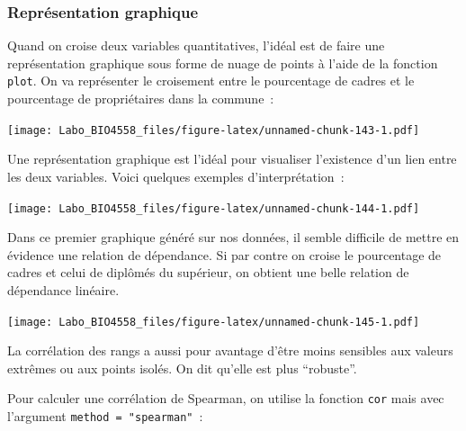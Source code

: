 \documentclass[12pt,]{book}
\newenvironment{Shaded}{\begin{snugshade}}{\end{snugshade}}
\newcommand{\KeywordTok}[1]{\textcolor[rgb]{0.27,0.27,0.27}{\textbf{#1}}}
\newcommand{\NormalTok}[1]{#1}
\newcommand{\OperatorTok}[1]{\textcolor[rgb]{0.43,0.43,0.43}{\textbf{#1}}}
\begin{document}
\hypertarget{repruxe9sentation-graphique-2}{%
\subsubsection{Représentation graphique}\label{repruxe9sentation-graphique-2}}

Quand on croise deux variables quantitatives, l'idéal est de faire une représentation graphique sous forme de nuage de points à l'aide de la fonction \texttt{plot}. On va représenter le croisement entre le pourcentage de cadres et le pourcentage de propriétaires dans la commune~:

\begin{Shaded}
\end{Shaded}

\texttt{[image: Labo\_BIO4558\_files/figure-latex/unnamed-chunk-143-1.pdf]}

Une représentation graphique est l'idéal pour visualiser l'existence d'un lien entre les deux variables. Voici quelques exemples d'interprétation~:

\texttt{[image: Labo\_BIO4558\_files/figure-latex/unnamed-chunk-144-1.pdf]}

Dans ce premier graphique généré sur nos données, il semble difficile de mettre en évidence une relation de dépendance. Si par contre on croise le pourcentage de cadres et celui de diplômés du supérieur, on obtient une belle relation de dépendance linéaire.

\begin{Shaded}
\end{Shaded}

\texttt{[image: Labo\_BIO4558\_files/figure-latex/unnamed-chunk-145-1.pdf]}

La corrélation des rangs a aussi pour avantage d'être moins sensibles aux valeurs extrêmes ou aux points isolés. On dit qu'elle est plus ``robuste''.

Pour calculer une corrélation de Spearman, on utilise la fonction \texttt{cor} mais avec l'argument \texttt{method\ =\ "spearman"}~:
\end{document}

